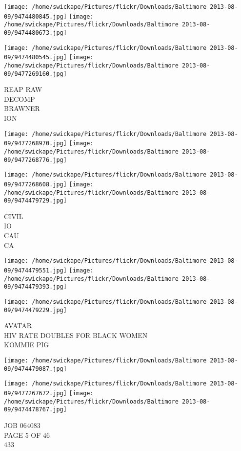 \documentclass[10pt,letterpaper]{article}
\begin{document}
\texttt{[image: /home/swickape/Pictures/flickr/Downloads/Baltimore 2013-08-09/9474480845.jpg]}
\texttt{[image: /home/swickape/Pictures/flickr/Downloads/Baltimore 2013-08-09/9474480673.jpg]}

\texttt{[image: /home/swickape/Pictures/flickr/Downloads/Baltimore 2013-08-09/9474480545.jpg]}
\texttt{[image: /home/swickape/Pictures/flickr/Downloads/Baltimore 2013-08-09/9477269160.jpg]}

REAP RAW\\
DECOMP\\
BRAWNER\\
ION
\pagebreak

\texttt{[image: /home/swickape/Pictures/flickr/Downloads/Baltimore 2013-08-09/9477268970.jpg]}
\texttt{[image: /home/swickape/Pictures/flickr/Downloads/Baltimore 2013-08-09/9477268776.jpg]}

\texttt{[image: /home/swickape/Pictures/flickr/Downloads/Baltimore 2013-08-09/9477268608.jpg]}
\texttt{[image: /home/swickape/Pictures/flickr/Downloads/Baltimore 2013-08-09/9474479729.jpg]}

CIVIL\\
IO\\
CAU\\
CA
\pagebreak

\texttt{[image: /home/swickape/Pictures/flickr/Downloads/Baltimore 2013-08-09/9474479551.jpg]}
\texttt{[image: /home/swickape/Pictures/flickr/Downloads/Baltimore 2013-08-09/9474479393.jpg]}

\texttt{[image: /home/swickape/Pictures/flickr/Downloads/Baltimore 2013-08-09/9474479229.jpg]}

AVATAR\\
HIV RATE DOUBLES FOR BLACK WOMEN\\
KOMMIE PIG
\pagebreak

\texttt{[image: /home/swickape/Pictures/flickr/Downloads/Baltimore 2013-08-09/9474479087.jpg]}

\vspace{0.25in}
\texttt{[image: /home/swickape/Pictures/flickr/Downloads/Baltimore 2013-08-09/9477267672.jpg]}
\texttt{[image: /home/swickape/Pictures/flickr/Downloads/Baltimore 2013-08-09/9474478767.jpg]}

JOB 064083\\
PAGE 5 OF 46\\
433
\pagebreak
\end{document}
